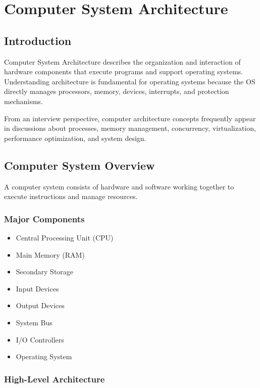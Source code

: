 \chapter{Computer System Architecture}

\section{Introduction}

Computer System Architecture describes the organization and interaction of hardware components that execute programs and support operating systems. Understanding architecture is fundamental for operating systems because the OS directly manages processors, memory, devices, interrupts, and protection mechanisms.

From an interview perspective, computer architecture concepts frequently appear in discussions about processes, memory management, concurrency, virtualization, performance optimization, and system design.

\section{Computer System Overview}

A computer system consists of hardware and software working together to execute instructions and manage resources.

\subsection{Major Components}

\begin{itemize}
\item Central Processing Unit (CPU)
\item Main Memory (RAM)
\item Secondary Storage
\item Input Devices
\item Output Devices
\item System Bus
\item I/O Controllers
\item Operating System
\end{itemize}

\subsection{High-Level Architecture}

